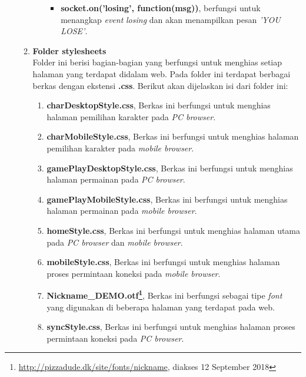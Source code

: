 \begin{enumerate}
\begin{enumerate}
\begin{enumerate}
\begin{itemize}
				\item \textbf{socket.on('losing', function(msg){})}, berfungsi untuk menangkap \textit{event} \textit{losing} dan akan menampilkan pesan \textit{'YOU LOSE'}.
			\end{itemize}
			
			
		\end{enumerate}
		\item \textbf{Folder stylesheets} \\ 
		Folder ini berisi bagian-bagian yang berfungsi untuk menghias setiap halaman yang terdapat didalam web. Pada folder ini terdapat berbagai berkas dengan ekstensi \textbf{.css}. Berikut akan dijelaskan isi dari folder ini:
		
		\begin{enumerate}
			\item \textbf{charDesktopStyle.css}, Berkas ini berfungsi untuk menghias halaman pemilihan karakter pada \textit{PC browser}.
			
			\item \textbf{charMobileStyle.css}, Berkas ini berfungsi untuk menghias halaman pemilihan karakter pada \textit{mobile browser}.
			
			\item \textbf{gamePlayDesktopStyle.css}, Berkas ini berfungsi untuk menghias halaman permainan pada \textit{PC browser}.
			
			\item \textbf{gamePlayMobileStyle.css}, Berkas ini berfungsi untuk menghias halaman permainan pada \textit{mobile browser}.
			
			\item \textbf{homeStyle.css}, Berkas ini berfungsi untuk menghias halaman utama pada \textit{PC browser} dan \textit{mobile browser}.
			
			\item \textbf{mobileStyle.css}, Berkas ini berfungsi untuk menghias halaman proses permintaan koneksi pada \textit{mobile browser}.
			
			\item \textbf{Nickname\_DEMO.otf\footnote{\url{http://pizzadude.dk/site/fonts/nickname}, diakses 12 September 2018}}, Berkas ini berfungsi sebagai tipe \textit{font} yang digunakan di beberapa halaman yang terdapat pada web.
			
			\item \textbf{syncStyle.css}, Berkas ini berfungsi untuk menghias halaman proses permintaan koneksi pada \textit{PC browser}.
			

\end{enumerate}
\end{enumerate}
\end{enumerate}
